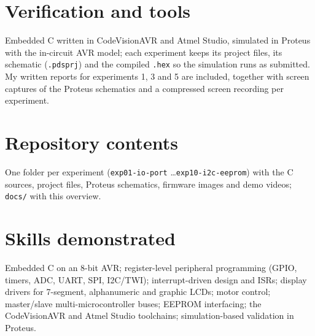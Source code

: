 \documentclass[10pt,a4paper]{article}
\begin{document}
\section*{Verification and tools}
Embedded C written in CodeVisionAVR and Atmel Studio, simulated in Proteus with the in-circuit AVR model; each
experiment keeps its project files, its schematic (\texttt{.pdsprj}) and the compiled \texttt{.hex} so the simulation
runs as submitted. My written reports for experiments 1, 3 and 5 are included, together with screen captures of the
Proteus schematics and a compressed screen recording per experiment.

\section*{Repository contents}
One folder per experiment (\texttt{exp01-io-port} \dots \texttt{exp10-i2c-eeprom}) with the C sources, project files,
Proteus schematics, firmware images and demo videos; \texttt{docs/} with this overview.

\section*{Skills demonstrated}
Embedded C on an 8-bit AVR; register-level peripheral programming (GPIO, timers, ADC, UART, SPI, I2C/TWI);
interrupt-driven design and ISRs; display drivers for 7-segment, alphanumeric and graphic LCDs; motor control;
master/slave multi-microcontroller buses; EEPROM interfacing; the CodeVisionAVR and Atmel Studio toolchains;
simulation-based validation in Proteus.
\end{document}
